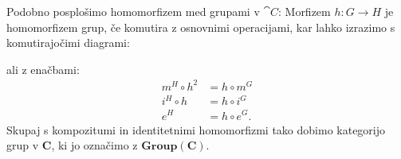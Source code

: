 \documentclass[../kategoricna_logika.tex]{subfiles}
\begin{document}
Podobno posplošimo homomorfizem med grupami v $\cat{C}$: Morfizem
$h : G \to H$ je homomorfizem grup, če komutira z osnovnimi operacijami,
kar lahko izrazimo s komutirajočimi diagrami:
%
\begin{center}
\end{center}
ali z enačbami:
\begin{align*}
m^H \circ h^2 &= h \circ m^G \\
i^H \circ h &= h \circ i^G \\
e^H &= h \circ e^G.
\end{align*}
Skupaj s kompozitumi in identitetnimi homomorfizmi tako dobimo
kategorijo grup v $\mathbf{C}$, ki jo označimo z $\mathbf{Group}(\mathbf{C})$.
\end{document}
